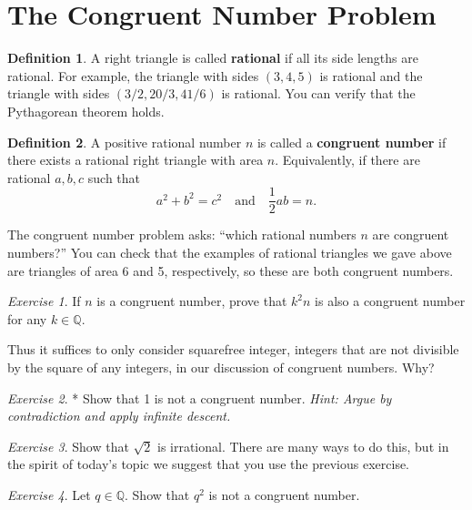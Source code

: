 \documentclass{article}
\theoremstyle{definition}
\newtheorem{definition}{Definition}%
\theoremstyle{remark}
\newtheorem{exercise}{Exercise}
\newcommand{\QQ}{\mathbb{Q}}
\begin{document}
\section{The Congruent Number Problem}

\begin{definition}
    A right triangle is called \textbf{rational} if all its side lengths are rational.
    For example, the triangle with sides \((3,4,5)\) is rational and the triangle with sides \((3/2,20/3,41/6)\) is rational.
    You can verify that the Pythagorean theorem holds.
\end{definition}

\begin{definition}
    A positive rational number \(n\) is called a \textbf{congruent number} if there exists a rational right triangle with area \(n\).
    Equivalently, if there are rational \(a,b,c\) such that 
   \[a^2+b^2=c^2\quad\text{and}\quad \frac{1}{2}ab=n.\]
\end{definition}

The congruent number problem asks: ``which rational numbers \(n\) are congruent numbers?''
You can check that the examples of rational triangles we gave above are triangles of area 6 and 5, respectively, so these are both congruent numbers.

\begin{exercise}
    If \(n\) is a congruent number, prove that \(k^2n\) is also a congruent number for any \(k\in\QQ\).
\end{exercise}

Thus it suffices to only consider squarefree integer, integers that are not divisible by the square of any integers, in our discussion of congruent numbers. Why?

\begin{exercise}*
    Show that 1 is not a congruent number.
    {\it Hint: Argue by contradiction and apply infinite descent.}
\end{exercise}

\begin{exercise}
    Show that \(\sqrt{2}\) is irrational.
	There are many ways to do this, but in the spirit of today's topic we suggest that you use the previous exercise.
\end{exercise}

\begin{exercise}
    Let \(q\in\QQ\).
    Show that \(q^2\) is not a congruent number.
\end{exercise}
\end{document}
